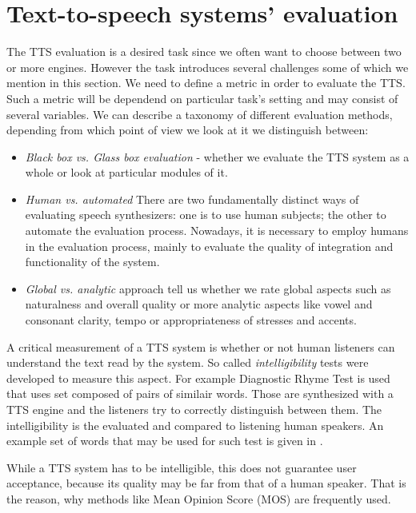 \section{Text-to-speech systems' evaluation}
The TTS evaluation\cite{huang2001spoken} is a desired task since we often want to choose between two or more engines.
However the task introduces several challenges some of which we mention in this section.
We need to define a metric in order to evaluate the TTS.
Such a metric will be dependend on particular task's setting and may consist of several variables.
We can describe a taxonomy of different evaluation methods, depending from which point of view we look at it we distinguish between:
\begin{itemize}
\item \textit{Black box vs. Glass box evaluation} - whether we evaluate the TTS system as a whole or look at particular modules of it.
\item \textit{Human vs. automated} There are two fundamentally distinct ways of evaluating
speech synthesizers: one is to use human subjects; the other to automate the evaluation process.
Nowadays, it is necessary to employ humans in the evaluation process, mainly to evaluate the quality of integration and functionality of the system.
\item \textit{Global vs. analytic} approach tell us whether we rate global aspects such as naturalness and overall quality or more analytic aspects like vowel and consonant clarity, tempo or appropriateness of stresses and accents.
\end{itemize}
\par
A critical measurement of a TTS system is whether or not human listeners can understand
the text read by the system. So called \textit{intelligibility} tests were developed to measure this aspect.
For example Diagnostic Rhyme Test is used that uses set composed of pairs of similair words.
Those are synthesized with a TTS engine and the listeners try to correctly distinguish between them.
The intelligibility is the evaluated and compared to listening human speakers.
An example set of words that may be used for such test is given in .
\par
While a TTS system has to be intelligible, this does not guarantee user acceptance, because
its quality may be far from that of a human speaker.
That is the reason, why methods like Mean Opinion Score (MOS) are frequently used.
